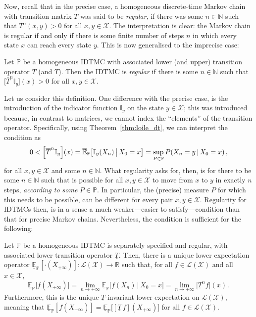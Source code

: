 \documentclass[graybox]{svmult}
\newcommand{\nats}{\mathbb{N}}
\newcommand{\reals}{\mathbb{R}}
\newcommand{\states}{\mathcal{X}}
\newcommand{\gambles}{\mathcal{L}}
\newcommand{\gamblesX}{\gambles(\states)}
\begin{document}
Now, recall that in the precise case, a homogeneous discrete-time Markov chain with transition matrix $T$ was said to be \emph{regular}, if there was some $n\in\nats$ such that $T^n(x,y)>0$ for all $x,y\in\states$. The interpretation is clear: the Markov chain is regular if and only if there is some finite number of steps $n$ in which every state $x$ can reach every state $y$. This is now generalised to the imprecise case:
\begin{definition}
Let $\mathbb{P}$ be a homogeneous IDTMC with associated lower (and upper) transition operator $\underline{T}$ (and $\overline{T}$). Then the IDTMC is \emph{regular} if there is some $n\in\nats$ such that $\bigl[\overline{T}^n\mathbb{I}_y\bigr](x)>0$ for all $x,y\in\states$.
\end{definition}
Let us consider this definition. One difference with the precise case, is the introduction of the indicator function $\mathbb{I}_y$ on the state $y\in\states$; this was introduced because, in contrast to matrices, we cannot index the ``elements'' of the transition operator. Specifically, using Theorem~\ref{thm:loile_dt}, we can interpret the condition as
\begin{equation*}
0 < \Bigl[\overline{T}^n\mathbb{I}_y\Bigr](x) = \overline{\mathbb{E}}_\mathbb{P}\bigl[\mathbb{I}_y(X_n)\,\big\vert\,X_0=x\bigr] = \sup_{P\in\mathbb{P}} P(X_n=y\,\vert\,X_0=x)\,,
\end{equation*}
for all $x,y\in\states$ and some $n\in\nats$. What regularity asks for, then, is for there to be some $n\in\nats$ such that is possible for all $x,y\in\states$ to move from $x$ to $y$ in exactly $n$ steps, \emph{according to some} $P\in\mathbb{P}$. In particular, the (precise) measure $P$ for which this needs to be possible, can be different for every pair $x,y\in\states$. Regularity for IDTMCs then, is in a sense a much weaker---easier to satisfy---condition than that for precise Markov chains. Nevertheless, the condition is sufficient for the following:

\begin{theorem}\label{theo:idtmc_ergodic_simple}
Let $\mathbb{P}$ be a homogeneous IDTMC is separately specified and regular, with associated lower transition operator $\underline{T}$. Then, there is a unique lower expectation operator $\underline{\mathbb{E}}_\mathbb{P}[\cdot(X_{+\infty})]:\gamblesX\to\reals$ such that, for all $f\in\gamblesX$ and all $x\in\states$,
\begin{equation*}
\underline{\mathbb{E}}_\mathbb{P}\bigl[f(X_{+\infty})\bigr] = \lim_{n\to+\infty} \underline{\mathbb{E}}_\mathbb{P}\bigl[f(X_n)\,\vert\,X_0=x\bigr] = \lim_{n\to+\infty} \bigl[\underline{T}^nf\bigr](x)\,.
\end{equation*}
Furthermore, this is the unique $\underline{T}$-invariant lower expectation on $\gamblesX$, meaning that $\underline{\mathbb{E}}_\mathbb{P}[f(X_{+\infty})]= \underline{\mathbb{E}}_\mathbb{P}\bigl[[\underline{T}\,f](X_{+\infty})\bigr]$ for all $f\in\gamblesX$.
\end{theorem}
\end{document}

